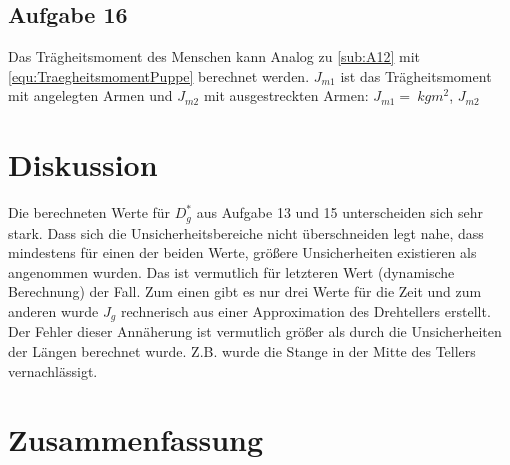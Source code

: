 \documentclass[a4paper,11pt,ngerman]{scrartcl}
\begin{document}
\subsection{Aufgabe 16}
Das Trägheitsmoment des Menschen kann Analog zu \cref{sub:A12} mit \cref{equ:TraegheitsmomentPuppe} berechnet werden. $J_{m1}$ ist das Trägheitsmoment mit angelegten Armen und $J_{m2}$ mit ausgestreckten Armen: $J_{m1} = \SI{}{kgm^2}$, $J_{m2}$

\section{Diskussion}
Die berechneten Werte für $D^*_g$ aus Aufgabe 13 und 15 unterscheiden sich sehr stark. Dass sich die Unsicherheitsbereiche nicht überschneiden legt nahe, dass mindestens für einen der beiden Werte, größere Unsicherheiten existieren als angenommen wurden. Das ist vermutlich für letzteren Wert (dynamische Berechnung) der Fall. Zum einen gibt es nur drei Werte für die Zeit und zum anderen wurde $J_g$ rechnerisch aus einer Approximation des Drehtellers erstellt. Der Fehler dieser Annäherung ist vermutlich größer als durch die Unsicherheiten der Längen berechnet wurde. Z.B. wurde die Stange in der Mitte des Tellers vernachlässigt.

\section{Zusammenfassung}
\end{document}
